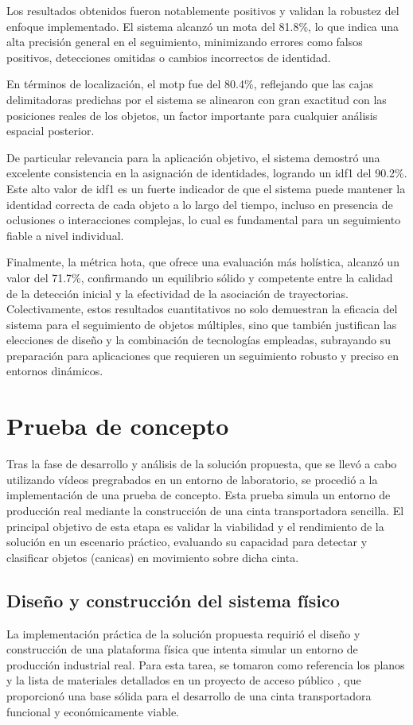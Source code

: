 \documentclass[11pt,spanish,listoffigures,listoftables]{tfgetsinf}
\begin{document}
Los resultados obtenidos fueron notablemente positivos y validan la robustez del enfoque implementado. El sistema alcanzó un \gls{mota} del 81.8\%, lo que indica una alta precisión general en el seguimiento, minimizando errores como falsos positivos, detecciones omitidas o cambios incorrectos de identidad.

En términos de localización, el \gls{motp} fue del 80.4\%, reflejando que las cajas delimitadoras predichas por el sistema se alinearon con gran exactitud con las posiciones reales de los objetos, un factor importante para cualquier análisis espacial posterior.

De particular relevancia para la aplicación objetivo, el sistema demostró una excelente consistencia en la asignación de identidades, logrando un \gls{idf1} del 90.2\%. Este alto valor de \gls{idf1} es un fuerte indicador de que el sistema puede mantener la identidad correcta de cada objeto a lo largo del tiempo, incluso en presencia de oclusiones o interacciones complejas, lo cual es fundamental para un seguimiento fiable a nivel individual.

Finalmente, la métrica \gls{hota}, que ofrece una evaluación más holística, alcanzó un valor del 71.7\%, confirmando un equilibrio sólido y competente entre la calidad de la detección inicial y la efectividad de la asociación de trayectorias.
Colectivamente, estos resultados cuantitativos no solo demuestran la eficacia del sistema para el seguimiento de objetos múltiples, sino que también justifican las elecciones de diseño y la combinación de tecnologías empleadas, subrayando su preparación para aplicaciones que requieren un seguimiento robusto y preciso en entornos dinámicos.

\chapter{Prueba de concepto} \label{chap:prueba_concepto}
Tras la fase de desarrollo y análisis de la solución propuesta, que se llevó a cabo utilizando vídeos pregrabados en un entorno de laboratorio, se procedió a la implementación de una prueba de concepto. Esta prueba simula un entorno de producción real mediante la construcción de una cinta transportadora sencilla. El principal objetivo de esta etapa es validar la viabilidad y el rendimiento de la solución en un escenario práctico, evaluando su capacidad para detectar y clasificar objetos (canicas) en movimiento sobre dicha cinta.

\section{Diseño y construcción del sistema físico} \label{sec:diseno_construccion}
La implementación práctica de la solución propuesta requirió el diseño y construcción de una plataforma física que intenta simular un entorno de producción industrial real. Para esta tarea, se tomaron como referencia los planos y la lista de materiales detallados en un proyecto de acceso público \cite{hackster_counting_inspection}, que proporcionó una base sólida para el desarrollo de una cinta transportadora funcional y económicamente viable.
\end{document}
